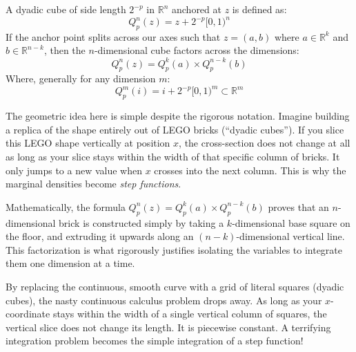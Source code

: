 \begin{math-stroke}
A dyadic cube of side length $2^{-p}$ in $\mathbb{R}^n$ anchored at $z$ is defined as:
\[
Q_p^n(z) = z + 2^{-p}[0, 1)^n
\]
If the anchor point splits across our axes such that $z = (a,b)$ where $a \in \mathbb{R}^k$ and $b \in \mathbb{R}^{n-k}$, then the $n$-dimensional cube factors across the dimensions:
\[
Q_p^n(z) = Q_p^k(a) \times Q_p^{n-k}(b)
\]
Where, generally for any dimension $m$:
\[
Q_p^m(i) = i + 2^{-p}[0, 1)^m \subset \mathbb{R}^m
\]

\begin{explanation-of-steps}
The geometric idea here is simple despite the rigorous notation. Imagine building a replica of the shape entirely out of LEGO bricks (``dyadic cubes''). If you slice this LEGO shape vertically at position $x$, the cross-section does not change at all as long as your slice stays within the width of that specific column of bricks. It only jumps to a new value when $x$ crosses into the next column. This is why the marginal densities become \textit{step functions}. 

Mathematically, the formula $Q_p^n(z) = Q_p^k(a) \times Q_p^{n-k}(b)$ proves that an $n$-dimensional brick is constructed simply by taking a $k$-dimensional base square on the floor, and extruding it upwards along an $(n-k)$-dimensional vertical line. This factorization is what rigorously justifies isolating the variables to integrate them one dimension at a time.
\end{explanation-of-steps}
\end{math-stroke}

\begin{didactic-insight}
By replacing the continuous, smooth curve with a grid of literal squares (dyadic cubes), the nasty continuous calculus problem drops away. As long as your $x$-coordinate stays within the width of a single vertical column of squares, the vertical slice does not change its length. It is piecewise constant. A terrifying integration problem becomes the simple integration of a step function!
\end{didactic-insight}
